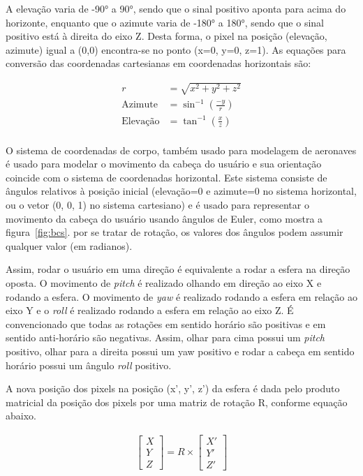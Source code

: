 A elevação varia de -90° a 90°, sendo que o sinal positivo aponta para acima do horizonte, enquanto que o azimute varia de -180° a 180°, sendo que o sinal positivo está à direita do eixo Z. Desta forma, o pixel na posição (elevação, azimute) igual a (0,0) encontra-se no ponto (x=0, y=0, z=1). As equações para conversão das coordenadas cartesianas em coordenadas horizontais são:

\begin{align}
    r &= \sqrt{x^2+y^2+z^2} \\
    \text{Azimute} &=\sin^{-1}\left(\frac{-y}{r}\right) \\
    \text{Elevação} &=\tan^{-1}\left(\frac{x}{z}\right)\\
    \label{eq:cart2hcs}
\end{align}


O sistema de coordenadas de corpo, também usado para modelagem de aeronaves é usado para modelar o movimento da cabeça do usuário e sua orientação coincide com o sistema de coordenadas horizontal. Este sistema consiste de ângulos relativos à posição inicial (elevação=0 e azimute=0 no sistema horizontal, ou o vetor (0, 0, 1) no sistema cartesiano) e é usado para representar o movimento da cabeça do usuário usando ângulos de Euler, como mostra a figura~\ref{fig:bcs}. por se tratar de rotação, os valores dos ângulos podem assumir qualquer valor (em radianos).

Assim, rodar o usuário em uma direção é equivalente a rodar a esfera na direção oposta. O movimento de \textit{pitch} é realizado olhando em direção ao eixo X e rodando a esfera. O movimento de \textit{yaw} é realizado rodando a esfera em relação ao eixo Y e o \textit{roll} é realizado rodando a esfera em relação ao eixo Z. É convencionado que todas as rotações em sentido horário são positivas e em sentido anti-horário são negativas. Assim, olhar para cima possui um \textit{pitch} positivo, olhar para a direita possui um yaw positivo e rodar a cabeça em sentido horário possui um ângulo \textit{roll} positivo.

A nova posição dos pixels na posição (x’, y’, z’) da esfera é dada pelo produto matricial da posição dos pixels por uma matriz de rotação R, conforme equação abaixo.

\begin{align*}
    \begin{bmatrix}
        X\\
        Y\\
        Z
    \end{bmatrix}
    =
    R \times
    \begin{bmatrix}
        X'\\
        Y'\\
        Z'
    \end{bmatrix}
\end{align*}

